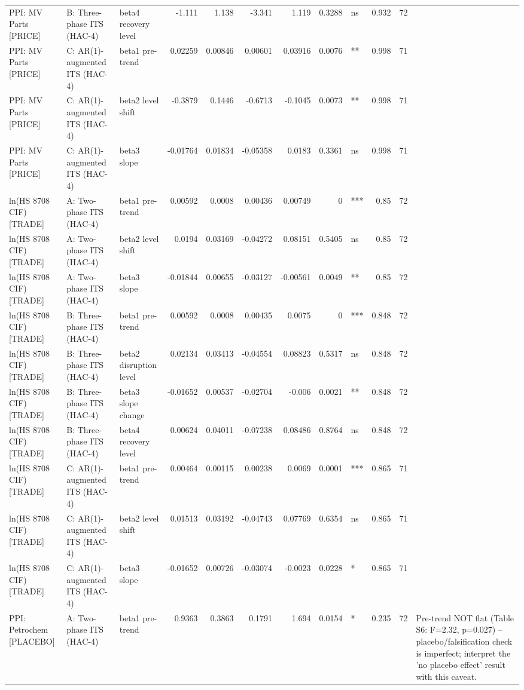 \begin{table}
\begin{tabular}{lllrrrrrlrrl}
PPI: MV Parts [PRICE] & B: Three-phase ITS (HAC-4) & beta4 recovery level & -1.111 & 1.138 & -3.341 & 1.119 & 0.3288 & ns & 0.932 & 72 &  \\
PPI: MV Parts [PRICE] & C: AR(1)-augmented ITS (HAC-4) & beta1 pre-trend & 0.02259 & 0.00846 & 0.00601 & 0.03916 & 0.0076 & ** & 0.998 & 71 &  \\
PPI: MV Parts [PRICE] & C: AR(1)-augmented ITS (HAC-4) & beta2 level shift & -0.3879 & 0.1446 & -0.6713 & -0.1045 & 0.0073 & ** & 0.998 & 71 &  \\
PPI: MV Parts [PRICE] & C: AR(1)-augmented ITS (HAC-4) & beta3 slope & -0.01764 & 0.01834 & -0.05358 & 0.0183 & 0.3361 & ns & 0.998 & 71 &  \\
ln(HS 8708 CIF) [TRADE] & A: Two-phase ITS (HAC-4) & beta1 pre-trend & 0.00592 & 0.0008 & 0.00436 & 0.00749 & 0 & *** & 0.85 & 72 &  \\
ln(HS 8708 CIF) [TRADE] & A: Two-phase ITS (HAC-4) & beta2 level shift & 0.0194 & 0.03169 & -0.04272 & 0.08151 & 0.5405 & ns & 0.85 & 72 &  \\
ln(HS 8708 CIF) [TRADE] & A: Two-phase ITS (HAC-4) & beta3 slope & -0.01844 & 0.00655 & -0.03127 & -0.00561 & 0.0049 & ** & 0.85 & 72 &  \\
ln(HS 8708 CIF) [TRADE] & B: Three-phase ITS (HAC-4) & beta1 pre-trend & 0.00592 & 0.0008 & 0.00435 & 0.0075 & 0 & *** & 0.848 & 72 &  \\
ln(HS 8708 CIF) [TRADE] & B: Three-phase ITS (HAC-4) & beta2 disruption level & 0.02134 & 0.03413 & -0.04554 & 0.08823 & 0.5317 & ns & 0.848 & 72 &  \\
ln(HS 8708 CIF) [TRADE] & B: Three-phase ITS (HAC-4) & beta3 slope change & -0.01652 & 0.00537 & -0.02704 & -0.006 & 0.0021 & ** & 0.848 & 72 &  \\
ln(HS 8708 CIF) [TRADE] & B: Three-phase ITS (HAC-4) & beta4 recovery level & 0.00624 & 0.04011 & -0.07238 & 0.08486 & 0.8764 & ns & 0.848 & 72 &  \\
ln(HS 8708 CIF) [TRADE] & C: AR(1)-augmented ITS (HAC-4) & beta1 pre-trend & 0.00464 & 0.00115 & 0.00238 & 0.0069 & 0.0001 & *** & 0.865 & 71 &  \\
ln(HS 8708 CIF) [TRADE] & C: AR(1)-augmented ITS (HAC-4) & beta2 level shift & 0.01513 & 0.03192 & -0.04743 & 0.07769 & 0.6354 & ns & 0.865 & 71 &  \\
ln(HS 8708 CIF) [TRADE] & C: AR(1)-augmented ITS (HAC-4) & beta3 slope & -0.01652 & 0.00726 & -0.03074 & -0.0023 & 0.0228 & * & 0.865 & 71 &  \\
PPI: Petrochem [PLACEBO] & A: Two-phase ITS (HAC-4) & beta1 pre-trend & 0.9363 & 0.3863 & 0.1791 & 1.694 & 0.0154 & * & 0.235 & 72 & Pre-trend NOT flat (Table S6: F=2.32, p=0.027) -- placebo/falsification check is imperfect; interpret the 'no placebo effect' result with this caveat. \\

\end{tabular}
\end{table}
